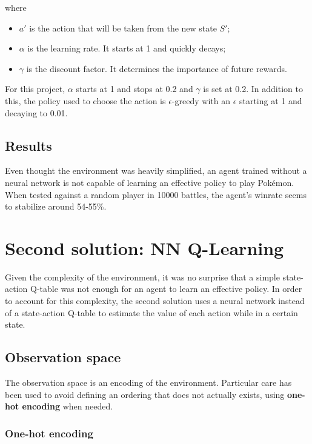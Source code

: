 \documentclass{article}
\begin{document}
where
\begin{itemize}
    \item $a'$ is the action that will be taken from the new state $S'$;
    \item $\alpha$ is the learning rate. It starts at 1 and quickly decays;
    \item $\gamma$ is the discount factor. It determines the importance of future rewards.
\end{itemize}
For this project, $\alpha$ starts at 1 and stops at 0.2 and $\gamma$ is set at 0.2.
In addition to this, the policy used to choose the action is $\epsilon$-greedy with an $\epsilon$ starting at 1 and decaying to 0.01.

\subsection{Results} \label{sarsa_results}

Even thought the environment was heavily simplified, an agent trained without a neural network is not capable of learning an effective policy to play Pokémon.
When tested against a random player in 10000 battles, the agent's winrate seems to stabilize around 54-55\%.


\section{Second solution: NN Q-Learning}

Given the complexity of the environment, it was no surprise that a simple state-action Q-table was not enough for an agent to learn an effective policy.
In order to account for this complexity, the second solution uses a neural network instead of a state-action Q-table to estimate the value of each action while in a certain state.

\subsection{Observation space}

The observation space is an encoding of the environment.
Particular care has been used to avoid defining an ordering that does not actually exists, using \textbf{one-hot encoding} when needed.

\subsubsection{One-hot encoding}
\end{document}
